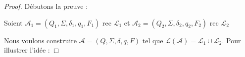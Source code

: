 \begin{proof}
Débutons la preuve :  

Soient $\mathcal{A}_1= (Q_1, \Sigma, \delta_1, q_1, F_1)$ rec $\mathcal{L}_1$ et $\mathcal{A}_2= (Q_2, \Sigma, \delta_2, q_2, F_2)$ rec $\mathcal{L}_2$

Nous voulons construire $\mathcal{A}= (Q, \Sigma, \delta, q, F)$ tel que $\mathcal{L}(\mathcal{A}) = \mathcal{L}_1 \cup \mathcal{L}_2$.
Pour illustrer l'idée :

\bigskip



\begin{tikzpicture}[x=0.75pt,y=0.75pt,yscale=-1,xscale=1]


\end{tikzpicture}
\end{proof}
